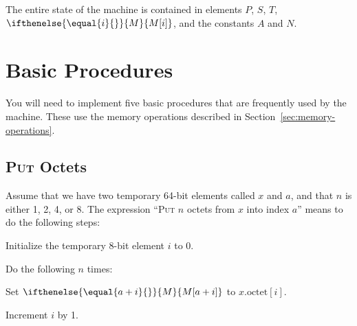 \documentclass[a4paper,12pt]{article}
\newcommand{\MEM}[1]{\ifthenelse{\equal{#1}{}}{M}{M[#1]}}
\newcommand{\PC}{P}
\newcommand{\SP}{S}
\newcommand{\TERM}{T}
\newcommand{\octno}[2]{#1.\mathrm{octet}[#2]}
\newcommand{\proc}[1]{\textsc{#1}}
\theoremstyle{definition}
\begin{document}
The entire state of the machine is contained in elements $\PC$, $\SP$, $\TERM$, $\MEM{i}$, and the constants $A$ and $N$.

\section{Basic Procedures}

You will need to implement five basic procedures that are frequently used by the machine.
These use the memory operations described in Section~\ref{sec:memory-operations}.

\subsection{\proc{Put} Octets}

Assume that we have two temporary 64-bit elements called $x$ and $a$, and that $n$ is either 1, 2, 4, or 8.
The expression ``\proc{Put} $n$ octets from $x$ into index $a$'' means to do the following steps:
\begin{stepnumbers}
\item Initialize the temporary 8-bit element $i$ to 0.
\item Do the following $n$ times:
  \begin{stepletters}
  \item Set $\MEM{a+i}$ to $\octno{x}{i}$.
  \item Increment $i$ by 1.
  \end{stepletters}
\end{stepnumbers}
\end{document}
